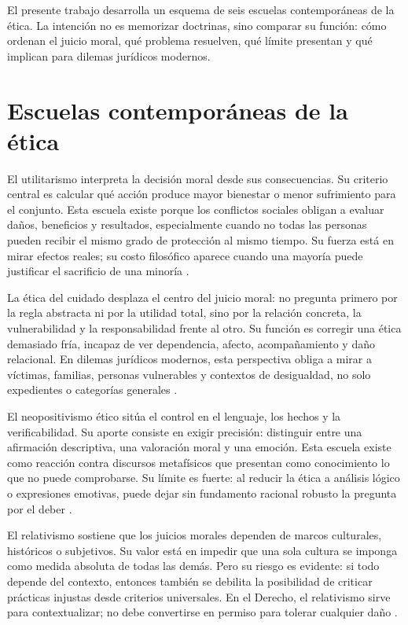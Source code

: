 \documentclass[
	spanish, %
	letterpaper, oneside
]{article}
\begin{document}
El presente trabajo desarrolla un esquema de seis escuelas contemporáneas de la ética. La intención no es memorizar doctrinas, sino comparar su función: cómo ordenan el juicio moral, qué problema resuelven, qué límite presentan y qué implican para dilemas jurídicos modernos.

\section{Escuelas contemporáneas de la ética}

El utilitarismo interpreta la decisión moral desde sus consecuencias. Su criterio central es calcular qué acción produce mayor bienestar o menor sufrimiento para el conjunto. Esta escuela existe porque los conflictos sociales obligan a evaluar daños, beneficios y resultados, especialmente cuando no todas las personas pueden recibir el mismo grado de protección al mismo tiempo. Su fuerza está en mirar efectos reales; su costo filosófico aparece cuando una mayoría puede justificar el sacrificio de una minoría \citep{ronquilloarmasEticaGeneralProfesional2018,singerCompendioEtica1995}.

La ética del cuidado desplaza el centro del juicio moral: no pregunta primero por la regla abstracta ni por la utilidad total, sino por la relación concreta, la vulnerabilidad y la responsabilidad frente al otro. Su función es corregir una ética demasiado fría, incapaz de ver dependencia, afecto, acompañamiento y daño relacional. En dilemas jurídicos modernos, esta perspectiva obliga a mirar a víctimas, familias, personas vulnerables y contextos de desigualdad, no solo expedientes o categorías generales \citep{singerCompendioEtica1995}.

El neopositivismo ético sitúa el control en el lenguaje, los hechos y la verificabilidad. Su aporte consiste en exigir precisión: distinguir entre una afirmación descriptiva, una valoración moral y una emoción. Esta escuela existe como reacción contra discursos metafísicos que presentan como conocimiento lo que no puede comprobarse. Su límite es fuerte: al reducir la ética a análisis lógico o expresiones emotivas, puede dejar sin fundamento racional robusto la pregunta por el deber \citep{singerCompendioEtica1995}.

El relativismo sostiene que los juicios morales dependen de marcos culturales, históricos o subjetivos. Su valor está en impedir que una sola cultura se imponga como medida absoluta de todas las demás. Pero su riesgo es evidente: si todo depende del contexto, entonces también se debilita la posibilidad de criticar prácticas injustas desde criterios universales. En el Derecho, el relativismo sirve para contextualizar; no debe convertirse en permiso para tolerar cualquier daño \citep{singerCompendioEtica1995}.
\end{document}
